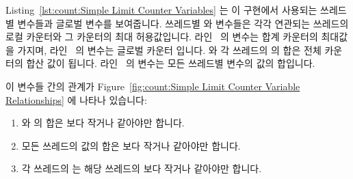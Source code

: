 \begin{lineref}
\begin{lineref}
Listing~\ref{lst:count:Simple Limit Counter Variables} 는 이 구현에서 사용되는
쓰레드별 변수들과 글로벌 변수를 보여줍니다.
쓰레드별  와  변수들은 각각 연관되는 쓰레드의 로컬
카운터와 그 카운터의 최대 허용값입니다.
라인~ 의  변수는 합계 카운터의
최대값을 가지며, 라인~ 의  변수는 글로벌
카운터 입니다.
 와 각 쓰레드의  의 합은 전체 카운터의 합산 값이
됩니다.
라인~ 의  변수는 모든 쓰레드별
 변수의 값의 합입니다.

\end{lineref}
이 변수들 간의 관계가
Figure~\ref{fig:count:Simple Limit Counter Variable Relationships} 에 나타나
있습니다:

\begin{enumerate}
\item	{} 와  의 합은  보다
	작거나 같아야만 합니다.
\item	모든 쓰레드의  값의 합은  보다 작거나
	같아야만 합니다.
\item	각 쓰레드의  는 해당 쓰레드의  보다 작거나
	같아야만 합니다.

\end{enumerate}


\end{lineref}
